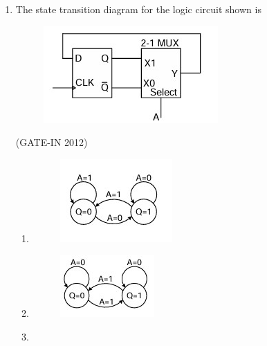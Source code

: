 \documentclass[journal,12pt,onecolumn]{IEEEtran}
\theoremstyle{remark}
\begin{document}
\begin{enumerate}
\item The state transition diagram for the logic circuit shown is
\begin{figure}[H]
    \centering
    \includegraphics[width=0.5\columnwidth]{figs/a14.jpg}
    \caption*{}
    \label{fig:a14}
\end{figure}

\hfill{(GATE-IN 2012)}
 \begin{multicols}{2}
    \begin{enumerate} 
        \item  
            
       \begin{figure}[H]
    \centering
    \includegraphics[width=0.5\columnwidth]{figs/a15.jpg}
    \caption{}
    \label{fig:a15}
\end{figure}
        \item  

           \begin{figure}[H]
    \centering
    \includegraphics[width=0.5\columnwidth]{figs/a16.jpg}
    \caption{}
    \label{fig:a16}
\end{figure}
        \item  


\end{enumerate}
\end{multicols}
\end{enumerate}
\end{document}

